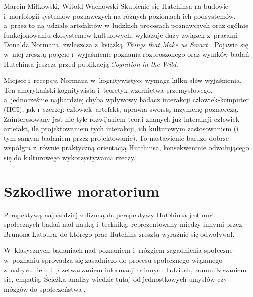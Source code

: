 \begin{artplenv2auth}{Marcin Miłkowski, Witold Wachowski}
Skupienie się Hutchinsa na budowie i~morfologii systemów poznawczych na różnych poziomach ich podsystemów, a~przez to na udziale artefaktów w~ludzkich procesach poznawczych oraz ogólnie funkcjonowaniu ekosystemów kulturowych, wykazuje duży związek z~pracami Donalda Normana, zwłaszcza z~książką \textit{Things that Make us Smart}
\parencite*[][]{salomon_distributed_1993}. %
 Pojawia się w~niej zresztą pojęcie i~wyjaśnienie poznania rozproszonego oraz wyników badań Hutchinsa jeszcze przed publikacją \textit{Cognition in the Wild}.

Miejsce i~recepcja Normana w~kognitywistyce wymaga kilku słów wyjaśnienia. Ten amerykański kognitywista i~teoretyk wzornictwa przemysłowego, a~jednocześnie najbardziej chyba wpływowy badacz interakcji człowiek-komputer (HCI), jak i~szerzej: człowiek–artefakt, uprawia swoistą inżynierię poznawczą. Zainteresowany jest nie tyle rozwijaniem teorii znanych już interakcji człowiek–artefakt, ile projektowaniem tych interakcji, ich kulturowym zastosowaniem (i tym samym badaniem przez projektowanie). To nastawienie bardzo dobrze współgra z~równie praktyczną orientacją Hutchinsa, konsekwentnie odwołującego się do kulturowego wykorzystywania rzeczy.

\section{Szkodliwe moratorium}

Perspektywą najbardziej zbliżoną do perspektywy Hutchinsa jest nurt społecznych badań nad nauką i~techniką, reprezentowany między innymi przez Brunona Latoura, do którego prac Hutchins zresztą wyraźnie się odwoływał.

W~klasycznych badaniach nad poznaniem i~mózgiem zagadnienia społeczne w~poznaniu sprowadza się zasadniczo do procesu społecznego wiązanego z~nabywaniem i~przetwarzaniem informacji o~innych ludziach, komunikowaniem się, empatią. Ścieżka analizy wiedzie tutaj od jednostkowych umysłów czy mózgów do społeczeństwa
\parencite[zob. np.][]{fiske_social_2008}.%



\end{artplenv2auth}
